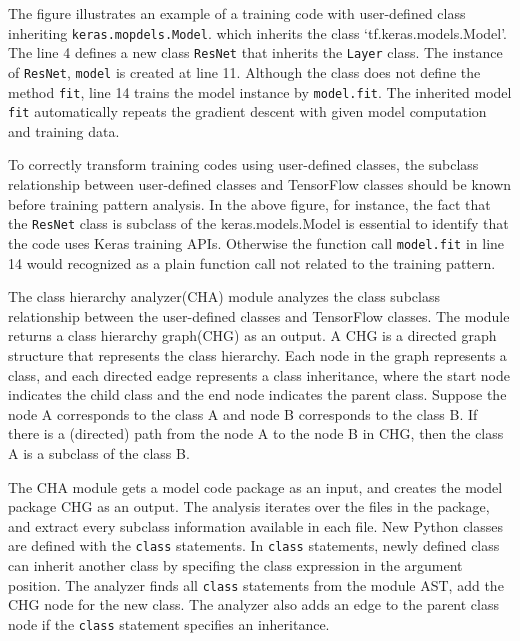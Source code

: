 

The figure illustrates an example of a training code with
user-defined class inheriting {\tt keras.mopdels.Model}.
which inherits the class `tf.keras.models.Model'.
The line 4 defines a new class {\tt ResNet} that inherits the  
{\tt Layer} class. The instance of {\tt ResNet}, {\tt model}
is created at line 11. Although the class does not define
the method {\tt fit}, line 14 trains the model instance by
{\tt model.fit}. The inherited model {\tt fit}
automatically repeats the gradient descent with
given model computation and training data. 

To correctly transform training codes using user-defined classes,
the subclass relationship between user-defined classes
and TensorFlow classes should be known before training pattern analysis. 
In the above figure, for instance, the fact that the {\tt ResNet} class
is subclass of the {keras.models.Model} is essential to identify
that the code uses Keras training APIs. 
Otherwise the function call {\tt model.fit} in line 14 would
recognized as a plain function call not related to the training pattern.

The class hierarchy analyzer(CHA) module analyzes the
class subclass relationship between the 
user-defined classes and TensorFlow classes.
The module returns a class hierarchy graph(CHG) as an output.
A CHG is a directed graph structure that represents the class hierarchy.
Each node in the graph represents a class,
and each directed eadge represents a class inheritance,
where the start node indicates the child class
and the end node indicates the parent class.
Suppose the node A corresponds to the class A and node B corresponds to
the class B.
If there is a (directed) path from the node A to the node B in CHG,
then the class A is a subclass of the class B.

The CHA module gets a model code package as an input,
and creates the model package CHG as an output.
The analysis iterates over the files in the package,
and extract every subclass information available in each file.
New Python classes are defined with the {\tt class} statements.
In {\tt class} statements, newly defined class can
inherit another class by specifing the class expression
in the argument position.
The analyzer finds all {\tt class} statements from the module AST,
add the CHG node for the new class. The analyzer also adds an edge
to the parent class node if the {\tt class} statement specifies an inheritance.

